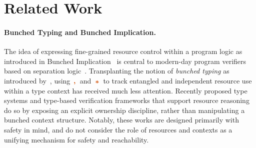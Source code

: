 \section{Related Work}%
\label{sec:related}

\paragraph{Bunched Typing and Bunched Implication.}

The idea of expressing fine-grained resource control within a program
logic as introduced in Bunched Implication~\cite{OHP99} is central to
modern-day program verifiers~\cite{AD+14,Iris,SLK+21,MSJ16,GM+25}
based on separation logic~\cite{SeparationLogic,OH19}.  Transplanting
the notion of \emph{bunched typing} as introduced
by~\citet{BunchedType}, using $\ctcomma$ and $\ctstar$ to track
entangled and independent resource use within a type context has
received much less attention.  Recently proposed type systems and
type-based verification frameworks that support resource
reasoning~\cite{FR+21,PLM+23,JJKD18} do so by exposing an explicit
ownership discipline, rather than manipulating a bunched context
structure.  Notably, these works are designed primarily with safety in
mind, and do not consider the role of resources and contexts as a
unifying mechanism for safety and reachability.

